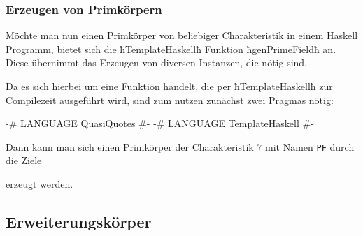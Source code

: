 \subsubsection{Erzeugen von Primkörpern}
Möchte man nun einen Primkörper von beliebiger Charakteristik in einem Haskell
Programm, bietet sich die ħTemplateHaskellħ Funktion ħgenPrimeFieldħ an. Diese
übernimmt das Erzeugen von diversen Instanzen, die nötig sind.

Da es sich hierbei um eine Funktion handelt, die per ħTemplateHaskellħ zur
Compilezeit ausgeführt wird, sind zum nutzen zunächst zwei Pragmas nötig:
\begin{hcode}
{-# LANGUAGE QuasiQuotes #-}
{-# LANGUAGE TemplateHaskell #-}
\end{hcode}
Dann kann man sich einen Primkörper der Charakteristik $7$ mit Namen
\texttt{PF} durch die Ziele
erzeugt werden.

\subsection{Erweiterungskörper}

